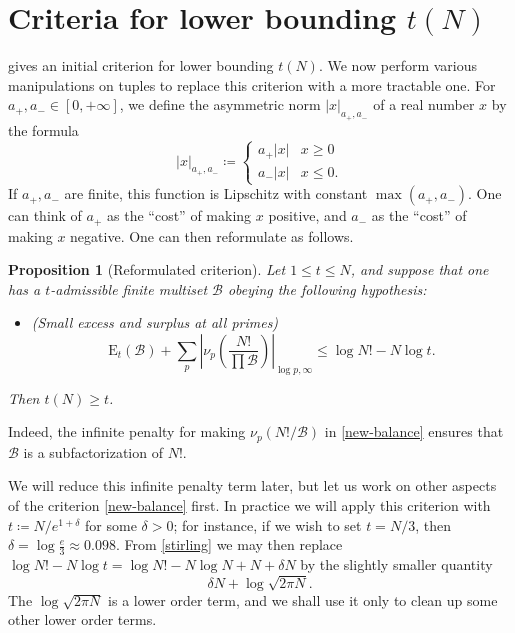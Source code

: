 \documentclass[12pt,a4paper,reqno]{amsart}
\numberwithin{equation}{section}
\theoremstyle{plain}
\newtheorem{proposition}[theorem]{Proposition}
\theoremstyle{definition}
\newcommand\tuple{{\mathcal B}}
\newcommand\excess{{\mathrm{E}}}
\begin{document}
\section{Criteria for lower bounding \texorpdfstring{$t(N)$}{t(N)}}

 gives an initial criterion for lower bounding $t(N)$.  We now perform various manipulations on tuples to replace this criterion with a more tractable one.
For $a_+,a_- \in [0,+\infty]$, we define the asymmetric norm $|x|_{a_+,a_-}$ of a real number $x$ by the formula
$$ 
|x|_{a_+,a_-} \coloneqq  \begin{cases} 
  a_+ |x| & x\geq 0 \\
  a_- |x| & x\leq 0.
\end{cases}
$$
If $a_+,a_-$ are finite, this function is Lipschitz with constant $\max(a_+,a_-)$.  One can think of $a_+$ as the ``cost'' of making $x$ positive, and $a_-$ as the
``cost'' of making $x$ negative.  One can then reformulate  as follows.

\begin{proposition}[Reformulated criterion]\label{balance-reform}  Let $1 \leq t \leq N$, and suppose that one has a $t$-admissible finite multiset $\tuple$ obeying the following hypothesis:
  \begin{itemize}
  \item[(i)] (Small excess and surplus at all primes)
  \begin{equation}\label{new-balance}
    \excess_t(\tuple) + \sum_p \left|\nu_p\left(\frac{N!}{\prod \tuple}\right)\right|_{\log p,\infty} \leq \log N! - N \log t.
\end{equation}
\end{itemize}
Then $t(N) \geq t$.
\end{proposition}

Indeed, the infinite penalty for making $\nu_p(N!/\tuple)$ in \eqref{new-balance} ensures that $\tuple$ is a subfactorization of $N!$.

We will reduce this infinite penalty term later, but let us work on other aspects of the criterion \eqref{new-balance} first.  In practice we will apply this criterion with $t \coloneqq N / e^{1+\delta}$ for some $\delta>0$; for instance, if we wish to set $t = N/3$, then $\delta = \log \frac{e}{3} \approx 0.098$.  From \eqref{stirling} we may then replace $\log N! - N \log t = \log N! - N \log N + N + \delta N$ by the slightly smaller quantity
$$ \delta N + \log \sqrt{2\pi N}.$$
The $\log \sqrt{2\pi N}$ is a lower order term, and we shall use it only to clean up some other lower order terms.
\end{document}
